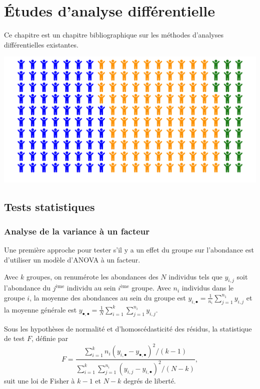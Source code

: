 \documentclass[12pt,a4paper]{reedthesis}
\theoremstyle{definition}
\theoremstyle{definition}
\theoremstyle{definition}
\theoremstyle{remark}
\begin{document}
\hypertarget{anadiff}{%
\chapter{Études d'analyse différentielle}\label{anadiff}}

Ce chapitre est un chapitre bibliographique sur les méthodes d'analyses différentielles existantes.
\begin{center}\includegraphics[width=0.9\linewidth]{img/cohort} \end{center}

\hypertarget{tests-statistiques}{%
\section{Tests statistiques}\label{tests-statistiques}}

\hypertarget{analyse-de-la-variance-uxe0-un-facteur}{%
\subsection{Analyse de la variance à un facteur}\label{analyse-de-la-variance-uxe0-un-facteur}}

Une première approche pour tester s'il y a un effet du groupe sur l'abondance est d'utiliser un modèle d'ANOVA à un facteur.

Avec \(k\) groupes, on renumérote les abondances des \(N\) individus tels que \(y_{i,j}\) soit l'abondance du \(j^{\text{ème}}\) individu au sein \(i^{\text{ème}}\) groupe. Avec \(n_i\) individus dans le groupe \(i\), la moyenne des abondances au sein du groupe est \(y_{i,\bullet} = \frac{1}{n_i}\sum_{j = 1}^{n_1} y_{i,j}\) et la moyenne générale est \(y_{\bullet, \bullet} = \frac{1}{N} \sum_{i=1}^k \sum_{j = 1}^{n_i} y_{i,j}\).

Sous les hypothèses de normalité et d'homoscédasticité des résidus, la statistique de test \(F\), définie par
\begin{equation*}
F = \frac{\sum_{i = 1}^k n_i \left(y_{i,\bullet} - y_{\bullet, \bullet} \right)^2 / (k - 1)}{\sum_{i=1}^k \sum_{j = 1}^{n_i} \left(y_{i,j} - y_{i,\bullet} \right)^2 / (N - k)},
\end{equation*}
suit une loi de Fisher à \(k - 1\) et \(N - k\) degrés de liberté.
\end{document}
